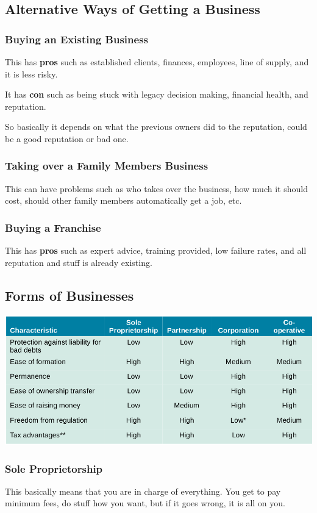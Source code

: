 \documentclass[12pt,letterpaper]{article} \usepackage{amsmath} \usepackage{graphicx} \usepackage[margin=1in]{geometry} \usepackage{longtable}  \usepackage{amssymb}
\begin{document}
		\subsection{Alternative Ways of Getting a Business}
		
		\subsubsection{Buying an Existing Business}
		This has \textbf{pros} such as established clients, finances, employees, line of supply, and it is less risky. 
		
		It has \textbf{con} such as being stuck with legacy decision making, financial health, and reputation.
		
		So basically it depends on what the previous owners did to the reputation, could be a good reputation or bad one. 
		
		\subsubsection{Taking over a Family Members Business}
		This can have problems such as who takes over the business, how much it should cost, should other family members automatically get a job, etc. 
		
		\subsubsection{Buying a Franchise}
		This has \textbf{pros} such as expert advice, training provided, low failure rates, and all reputation and stuff is already existing. 
		
		\subsection{Forms of Businesses}
		\begin{center}
			\includegraphics[width=0.7\linewidth]{screenshot001}
		\end{center}
		
		\subsubsection{Sole Proprietorship}
		This basically means that you are in charge of everything. You get to pay minimum fees, do stuff how you want, but if it goes wrong, it is all on you. 
		
\end{document}
